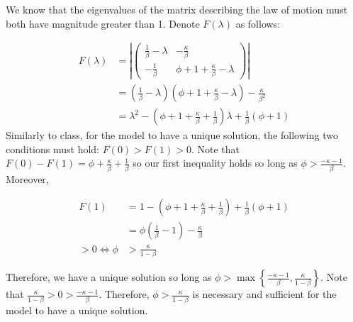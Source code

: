 \documentclass[11pt]{article} %
\begin{document}
We know that the eigenvalues of the matrix describing the law of motion must both have magnitude greater than 1. Denote $F(\lambda)$ as follows:

\begin{align*}
F(\lambda)  &= \left|  \begin{pmatrix} \frac{1}{\beta} - \lambda &  -\frac{\kappa }{\beta}  \\ -\frac{1}{\beta}  & \phi + 1 + \frac{\kappa}{\beta} - \lambda  \end{pmatrix} \right|\\
&= \left(  \frac{1 }{\beta} - \lambda \right) \left( \phi + 1 + \frac{\kappa}{\beta} - \lambda \right) - \frac{\kappa}{\beta^2} \\
&= \lambda^2 - \left( \phi + 1 + \frac{\kappa}{\beta} + \frac{1}{\beta}\right)\lambda + \frac{1}{\beta}\left( \phi + 1   \right) 
\end{align*}
 Similarly to class, for the model to have a unique solution, the following two conditions must hold: $F(0)>F(1) > 0$. Note that $F(0) - F(1) = \phi + \frac{\kappa}{\beta} + \frac{1}{\beta} $ so our first inequality holds so long as $\phi>\frac{-\kappa - 1}{\beta}$. Moreover,

\begin{align*}
F(1) &=  1 - \left(\phi + 1 + \frac{\kappa}{\beta} + \frac{1}{\beta}\right) + \frac{1}{\beta}\left( \phi + 1 \right) \\
&= \phi \left( \frac{1}{\beta} - 1\right) - \frac{\kappa}{\beta}\\
>0 \iff \phi &> \frac{\kappa}{1-\beta}
\end{align*}

Therefore, we have a unique solution so long as $\phi > \max\left\{ \frac{-\kappa - 1}{\beta} ,  \frac{\kappa}{1-\beta}\right\}$. Note that $\frac{\kappa}{1-\beta}>0>\frac{-\kappa - 1}{\beta} $. Therefore, $\phi >\frac{\kappa}{1-\beta}$ is necessary and sufficient for the model to have a unique solution.
\end{document}
